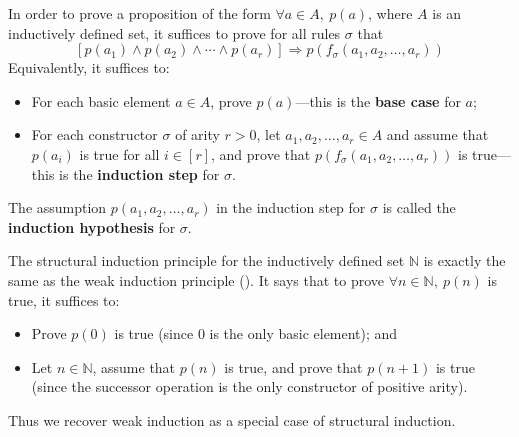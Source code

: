 \begin{strategy}
In order to prove a proposition of the form $\forall a \in A,~ p(a)$, where $A$ is an inductively defined set, it suffices to prove for all rules $\sigma$ that
\[ [p(a_1) \wedge p(a_2) \wedge \cdots \wedge p(a_r)] \Rightarrow p(f_{\sigma}(a_1,a_2,\dots,a_r)) \]
Equivalently, it suffices to:
\begin{itemize}
\item For each basic element $a \in A$, prove $p(a)$---this is the \textbf{base case} for $a$;
\item For each constructor $\sigma$ of arity $r>0$, let $a_1,a_2,\dots,a_r \in A$ and assume that $p(a_i)$ is true for all $i \in [r]$, and prove that $p(f_{\sigma}(a_1,a_2,\dots,a_r))$ is true---this is the \textbf{induction step} for $\sigma$.
\end{itemize}
The assumption $p(a_1,a_2,\dots,a_r)$ in the induction step for $\sigma$ is called the \textbf{induction hypothesis} for $\sigma$.
\end{strategy}

\begin{example}
The structural induction principle for the inductively defined set $\mathbb{N}$ is exactly the same as the weak induction principle (). It says that to prove $\forall n \in \mathbb{N},~ p(n)$ is true, it suffices to:
\begin{itemize}
\item Prove $p(0)$ is true (since $0$ is the only basic element); and
\item Let $n \in \mathbb{N}$, assume that $p(n)$ is true, and prove that $p(n+1)$ is true (since the successor operation is the only constructor of positive arity).
\end{itemize}
Thus we recover weak induction as a special case of structural induction.
\end{example}

